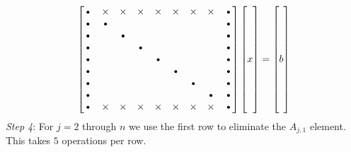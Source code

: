 \documentclass[12pt]{article}
\begin{document}
	$$
	\begin{bmatrix}
	\text{\textbullet}&\times&\times&\times&\times&\times&\times&\times&\text{\textbullet}\\
	\text{\textbullet}&\text{\textbullet}&&&&&&&\text{\textbullet}\\
	\text{\textbullet}&&\text{\textbullet}&&&&&&\text{\textbullet}\\
	\text{\textbullet}&&&\text{\textbullet}&&&&&\text{\textbullet}\\
	\text{\textbullet}&&&&\text{\textbullet}&&&&\text{\textbullet}\\
	\text{\textbullet}&&&&&\text{\textbullet}&&&\text{\textbullet}\\
	\text{\textbullet}&&&&&&\text{\textbullet}&&\text{\textbullet}\\
	\text{\textbullet}&&&&&&&\text{\textbullet}&\text{\textbullet}\\
	\text{\textbullet}&\times&\times&\times&\times&\times&\times&\times&\text{\textbullet}\\
	\end{bmatrix}\begin{bmatrix}\\ \\ \\ \\ x \\ \\ \\ \\ \\\end{bmatrix}= \begin{bmatrix}\\ \\ \\ \\ b \\ \\ \\ \\ \\\end{bmatrix}
	$$
	\emph{Step 4}: For $j=2$ through $n$ we use the first row to eliminate the $A_{j,1}$ element. This takes $5$ operations per row.
\end{document}
